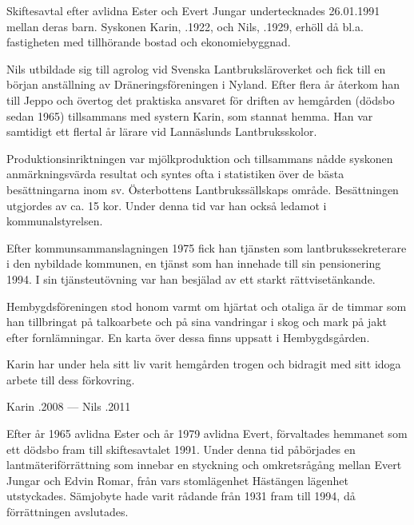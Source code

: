 %
Skiftesavtal efter avlidna Ester och Evert Jungar undertecknades 26.01.1991 mellan deras barn. Syskonen Karin, .1922, och Nils, .1929, erhöll då bl.a. fastigheten med tillhörande bostad och ekonomiebyggnad.

Nils utbildade sig till agrolog vid Svenska Lantbruksläroverket och fick till en början anställning av Dräneringsföreningen i Nyland. Efter flera år återkom han till Jeppo och övertog det praktiska ansvaret för driften av hemgården (dödsbo sedan 1965) tillsammans med systern Karin, som stannat hemma. Han var samtidigt ett flertal år lärare vid Lannäslunds Lantbruksskolor.

Produktionsinriktningen var mjölkproduktion och tillsammans nådde syskonen anmärkningsvärda resultat och syntes ofta i statistiken över de bästa besättningarna inom sv. Österbottens Lantbrukssällskaps område. Besättningen utgjordes av ca. 15 kor. Under denna tid var han också ledamot i kommunalstyrelsen.

Efter kommunsammanslagningen 1975 fick han tjänsten som lantbrukssekreterare i den nybildade kommunen, en tjänst som han innehade till sin pensionering 1994. I sin tjänsteutövning var han besjälad av ett starkt rättvisetänkande.

Hembygdsföreningen stod honom varmt om hjärtat och otaliga är de timmar som han tillbringat på talkoarbete och på sina vandringar i skog och mark på jakt efter fornlämningar. En karta över dessa finns uppsatt i Hembygdsgården.

Karin har under hela sitt liv varit hemgården trogen och bidragit med sitt idoga arbete till dess förkovring.

Karin .2008  ---  Nils .2011


%
Efter år 1965 avlidna Ester och år 1979 avlidna Evert, förvaltades hemmanet som ett dödsbo fram till skiftesavtalet 1991. Under denna tid påbörjades en lantmäteriförrättning som innebar en styckning och omkretsrågång mellan Evert Jungar och Edvin Romar, från vars stomlägenhet Hästängen lägenhet utstyckades. Sämjobyte hade varit rådande från 1931 fram till 1994, då förrättningen avslutades.



